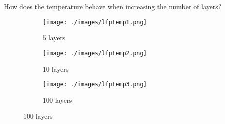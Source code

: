 \documentclass{beamer}
\begin{document}
\begin{frame}{How does the temperature behave when increasing the number of layers?}

  \begin{figure}
    \centering
    \hspace{-10mm}
    \begin{subfigure}[b]{0.35\linewidth}
      \centering
      \texttt{[image: ./images/lfptemp1.png]}
      \caption{5 layers}
    \end{subfigure}
    \begin{subfigure}[b]{0.35\linewidth}
      \centering
      \texttt{[image: ./images/lfptemp2.png]}
      \caption{10 layers}
    \end{subfigure}
    \begin{subfigure}[b]{0.35\linewidth}
      \centering
      \texttt{[image: ./images/lfptemp3.png]}
      \caption{100 layers}
    \end{subfigure}
  \end{figure}

\end{frame}





\end{document}
